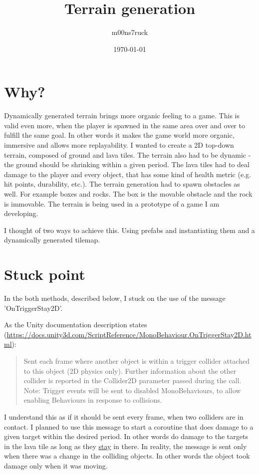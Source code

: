 \documentclass[11pt]{article}
\author{m00ns7ruck}
\date{\today}
\title{Terrain generation}
\begin{document}
\maketitle
\tableofcontents


\section{Why?}
\label{sec:org47ce588}
Dynamically generated terrain brings more organic feeling to a game. This is valid even more, when the player is spawned in the same area over and over to fulfill the same goal. In other words it makes the game world more organic, immersive and allows more replayability.
I wanted to create a 2D top-down terrain, composed of ground and lava tiles. The terrain also had to be dynamic - the ground should be shrinking within a given period. The lava tiles had to deal damage to the player and every object, that has some kind of health metric (e.g. hit points, durability, etc.). The terrain generation had to spawn obstacles as well. For example boxes and rocks. The box is the movable obstacle and the rock is immovable.
The terrain is being used in a prototype of a game I am developing.

I thought of two ways to achieve this. Using prefabs and instantiating them and a dynamically generated tilemap.

\section{Stuck point}
\label{sec:org2afadce}

In the both methods, described below, I stuck on the use of the message 'OnTriggerStay2D'.

As the Unity documentation description states (\url{https://docs.unity3d.com/ScriptReference/MonoBehaviour.OnTriggerStay2D.html}):

\begin{quote}
Sent each frame where another object is within a trigger collider attached to this object (2D physics only).
Further information about the other collider is reported in the Collider2D parameter passed during the call.
Note: Trigger events will be sent to disabled MonoBehaviours, to allow enabling Behaviours in response to collisions.
\end{quote}

I understand this as if it should be sent every frame, when two colliders are in contact.
I planned to use this message to start a coroutine that does damage to a given target within the desired period. In other words do damage to the targets in the lava tile as long as they \uline{stay} in there.
In reality, the message is sent only when there was a change in the colliding objects. In other words the object took damage only when it was moving.
\end{document}
